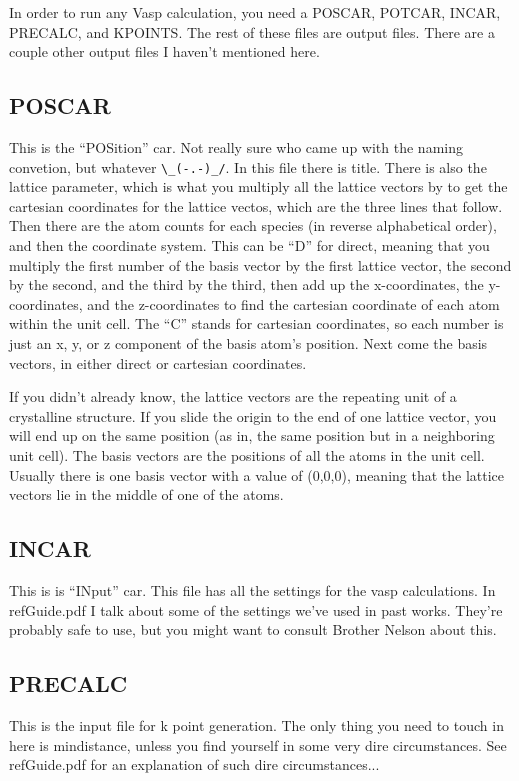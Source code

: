 \documentclass{article}
\begin{document}
In order to run any Vasp calculation, you need a POSCAR, POTCAR,
INCAR, PRECALC, and KPOINTS. The rest of these files are output
files. There are a couple other output files I haven't mentioned
here. 

\subsection*{POSCAR}
This is the ``POSition'' car. Not really sure who came up with the
naming convetion, but whatever \verb|\_(-.-)_/|.
In this file there is title. There is also the lattice parameter,
which is what you multiply all the lattice vectors by to get the
cartesian coordinates for the lattice vectos, which are the three
lines that follow. Then there are the atom counts for each species (in
reverse alphabetical order), and then the coordinate system. This can
be ``D'' for direct, meaning that you multiply the first number of the
basis vector by the first lattice vector, the second by the second,
and the third by the third, then add up the x-coordinates, the
y-coordinates, and the z-coordinates to find the cartesian coordinate
of each atom within the unit cell. The ``C'' stands for cartesian
coordinates, so each number is just an x, y, or z component of the
basis atom's position. Next come the basis vectors, in either direct
or cartesian coordinates. 

If you didn't already know, the lattice vectors are the repeating unit
of a crystalline structure. If you slide the origin to the end of one
lattice vector, you will end up on the same position (as in, the same position
but in a neighboring unit cell). The basis vectors are the positions
of all the atoms in the unit cell. Usually there is one basis vector
with a value of (0,0,0), meaning that the lattice vectors lie in the
middle of one of the atoms. 

\subsection*{INCAR}
This is is ``INput'' car. This file has all the settings for the vasp calculations. In
refGuide.pdf I talk about some of the settings we've
used in past works. They're probably safe to use, but you might want
to consult Brother Nelson about this. 

\subsection*{PRECALC}
This is the input file for k point generation. The only thing you need
to touch in here is mindistance, unless you find yourself in some very
dire circumstances. See refGuide.pdf for an explanation
of such dire circumstances...
\end{document}
